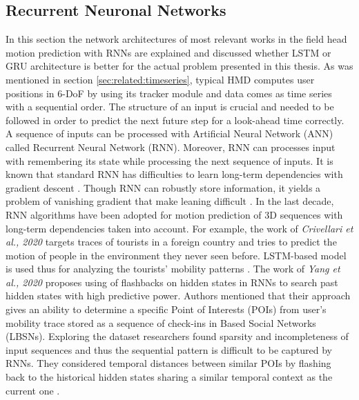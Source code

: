 \subsection{Recurrent Neuronal Networks}
\label{sec:related:deep}
In this section the network architectures of most relevant works in the field head motion prediction with RNNs are explained and discussed whether LSTM or GRU architecture is better for the actual problem presented in this thesis. As was mentioned in section \ref{sec:related:timeseries}, typical HMD computes user positions in 6-DoF by using its tracker module and data comes as time series with a sequential order. The structure of an input is crucial and needed to be followed in order to predict the next future step for a look-ahead time correctly. A sequence of inputs can be processed with Artificial Neural Network (ANN) called Recurrent Neural Network (RNN). Moreover, RNN can processes input with remembering its state while processing the next sequence of inputs. It is known that standard RNN has difficulties to learn long-term dependencies with gradient descent \cite{rnn_difficults}. Though RNN can robustly store information, it yields a problem of vanishing gradient that make leaning difficult \cite{rnn_difficults}. In the last decade, RNN algorithms have been adopted for motion prediction of 3D sequences with long-term dependencies taken into account. For example, the work of \textit{Crivellari et al., 2020} targets traces of tourists in a foreign country and tries to predict the motion of people in the environment they never seen before. LSTM-based model is used thus for analyzing the tourists’ mobility patterns \cite{tourist_traces}. The work of \textit{Yang et al., 2020} proposes using of flashbacks on hidden states in RNNs to search past hidden states with high predictive power. Authors mentioned that their approach gives an ability to determine a specific Point of Interests (POIs) from user’s mobility trace stored as a sequence of check-ins in Based Social Networks (LBSNs). Exploring the dataset researchers found sparsity and incompleteness of input sequences and thus the sequential pattern is difficult to be captured by RNNs. They considered temporal distances between similar POIs by flashing back to the historical hidden states sharing a similar temporal context as the current one \cite{rnn_traces_hidden}. \\
